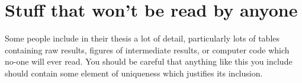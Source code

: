 \documentclass[12pt,a4paper]{report}
\begin{document}
\chapter{Stuff that won't be read by anyone}

Some people include in their thesis a lot of detail, particularly lots
of tables containing raw results, figures of intermediate results, or
computer code which no-one will ever read. You should be careful that
anything like this you include should contain some element of
uniqueness which justifies its inclusion.



\end{document}
